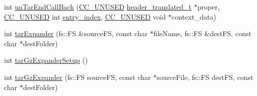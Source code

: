 \begin{DoxyCompactItemize}
\item 
int \hyperlink{ESP32-targz_8cpp_a1267a7655631d8c67c92be45ab507dc2}{un\+Tar\+End\+Call\+Back} (\hyperlink{ESP32-targz_8cpp_a88f6b33e1b3dd06a431809c0b41fccfa}{C\+C\+\_\+\+U\+N\+U\+S\+ED} \hyperlink{untar_8h_a9147d454aea305f52e7b97b50ed26918}{header\+\_\+translated\+\_\+t} $\ast$proper, \hyperlink{ESP32-targz_8cpp_a88f6b33e1b3dd06a431809c0b41fccfa}{C\+C\+\_\+\+U\+N\+U\+S\+ED} int \hyperlink{untar_8c_a36e3b8f9d08679a7381caa6c15ea9888}{entry\+\_\+index}, \hyperlink{ESP32-targz_8cpp_a88f6b33e1b3dd06a431809c0b41fccfa}{C\+C\+\_\+\+U\+N\+U\+S\+ED} void $\ast$context\+\_\+data)
\item 
int \hyperlink{ESP32-targz_8cpp_abc36fcba0a0fca53fc824ab44df1afa1}{tar\+Expander} (fs\+::\+FS \&source\+FS, const char $\ast$file\+Name, fs\+::\+FS \&dest\+FS, const char $\ast$dest\+Folder)
\item 
int \hyperlink{ESP32-targz_8cpp_af9aeb1c3b8dd4061cfbe745605a14af1}{tar\+Gz\+Expander\+Setup} ()
\item 
int \hyperlink{ESP32-targz_8cpp_a76329eedbd8f7da45209d5fde943536b}{tar\+Gz\+Expander} (fs\+::\+FS source\+FS, const char $\ast$source\+File, fs\+::\+FS dest\+FS, const char $\ast$dest\+Folder)
\end{DoxyCompactItemize}
